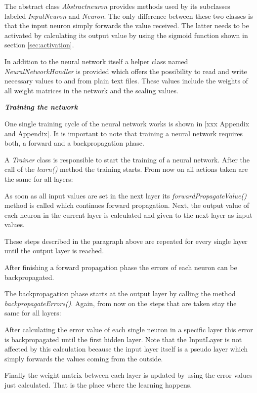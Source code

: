 The abstract class {\em Abstractneuron} provides methods used by its subclasses labeled {\em InputNeuron} and {\em Neuron}. The only difference between these two classes is that the input neuron simply forwards the value received. The latter needs to be activated by calculating its output value by using the sigmoid function shown in section \ref{sec:activation}.

In addition to the neural network itself a helper class named {\em NeuralNetworkHandler} is provided which offers the possibility to read and write necessary values to and from plain text files. These values include the weights of all weight matrices in the network and the scaling values.

{\em {\bf Training the network}}

One single training cycle of the neural network works is shown in [xxx Appendix and Appendix]. It is important to note that training a neural network requires both, a forward and a backpropagation phase.

A {\em Trainer} class is responsible to start the training of a neural network. After the call of the {\em learn()} method the training starts. From now on all actions taken are the same for all layers:

As soon as all input values are set in the next layer its {\em forwardPropagateValue()} method is called which continues forward propagation. Next, the output value of each neuron in the current layer is calculated and given to the next layer as input values.

These steps described in the paragraph above are repeated for every single layer until the output layer is reached.

After finishing a forward propagation phase the errors of each neuron can be backpropagated.

The backpropagation phase starts at the output layer by calling the method {\em backpropagateErrors()}. Again, from now on the steps that are taken stay the same for all layers:

After calculating the error value of each single neuron in a specific layer this error is backpropagated until the first hidden layer. Note that the InputLayer is not affected by this calculation because the input layer itself is a pseudo layer which simply forwards the values coming from the outside.

Finally the weight matrix between each layer is updated by using the error values just calculated. That is the place where the learning happens.

